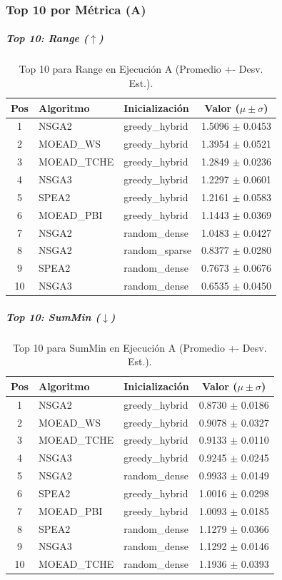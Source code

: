 \documentclass[a4paper,10pt]{article}
\begin{document}
\subsubsection{Top 10 por Métrica (A)}
\subparagraph{Top 10: Range ($\uparrow$)}
\begin{table}[H]
    \centering
    \begin{tabular}{cllc}
        \toprule
        Pos & Algoritmo & Inicialización & Valor ($\mu \pm \sigma$) \\
        \midrule
        1 & NSGA2 & greedy\_hybrid & 1.5096 $\pm$ 0.0453 \\
        2 & MOEAD\_WS & greedy\_hybrid & 1.3954 $\pm$ 0.0521 \\
        3 & MOEAD\_TCHE & greedy\_hybrid & 1.2849 $\pm$ 0.0236 \\
        4 & NSGA3 & greedy\_hybrid & 1.2297 $\pm$ 0.0601 \\
        5 & SPEA2 & greedy\_hybrid & 1.2161 $\pm$ 0.0583 \\
        6 & MOEAD\_PBI & greedy\_hybrid & 1.1443 $\pm$ 0.0369 \\
        7 & NSGA2 & random\_dense & 1.0483 $\pm$ 0.0427 \\
        8 & NSGA2 & random\_sparse & 0.8377 $\pm$ 0.0280 \\
        9 & SPEA2 & random\_dense & 0.7673 $\pm$ 0.0676 \\
        10 & NSGA3 & random\_dense & 0.6535 $\pm$ 0.0450 \\
        \bottomrule
    \end{tabular}
    \caption{Top 10 para Range en Ejecución A (Promedio +- Desv. Est.).}
\end{table}

\subparagraph{Top 10: SumMin ($\downarrow$)}
\begin{table}[H]
    \centering
    \begin{tabular}{cllc}
        \toprule
        Pos & Algoritmo & Inicialización & Valor ($\mu \pm \sigma$) \\
        \midrule
        1 & NSGA2 & greedy\_hybrid & 0.8730 $\pm$ 0.0186 \\
        2 & MOEAD\_WS & greedy\_hybrid & 0.9078 $\pm$ 0.0327 \\
        3 & MOEAD\_TCHE & greedy\_hybrid & 0.9133 $\pm$ 0.0110 \\
        4 & NSGA3 & greedy\_hybrid & 0.9245 $\pm$ 0.0245 \\
        5 & NSGA2 & random\_dense & 0.9933 $\pm$ 0.0149 \\
        6 & SPEA2 & greedy\_hybrid & 1.0016 $\pm$ 0.0298 \\
        7 & MOEAD\_PBI & greedy\_hybrid & 1.0093 $\pm$ 0.0185 \\
        8 & SPEA2 & random\_dense & 1.1279 $\pm$ 0.0366 \\
        9 & NSGA3 & random\_dense & 1.1292 $\pm$ 0.0146 \\
        10 & MOEAD\_TCHE & random\_dense & 1.1936 $\pm$ 0.0393 \\
        \bottomrule
    \end{tabular}
    \caption{Top 10 para SumMin en Ejecución A (Promedio +- Desv. Est.).}
\end{table}
\end{document}
